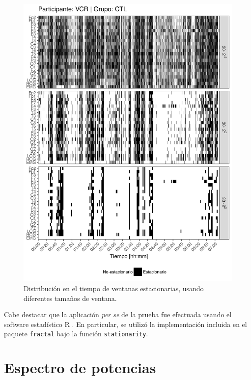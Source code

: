 \begin{figure}
\centering
\includegraphics[width=\linewidth]
{./img_art_dfa/VCNNS1_comp_est_.png}
\caption{Distribución en el tiempo de ventanas estacionarias, usando diferentes tamaños
de ventana.}
\label{comp_VCR}
\end{figure}

Cabe destacar que la aplicación \textit{per se} de la prueba fue efectuada usando el software 
estadístico R \cite{R_citar}. En particular, se utilizó la implementación 
incluida en el paquete \texttt{fractal} \cite{R_fractal} bajo la función \texttt{stationarity}.


\section{Espectro de potencias}

